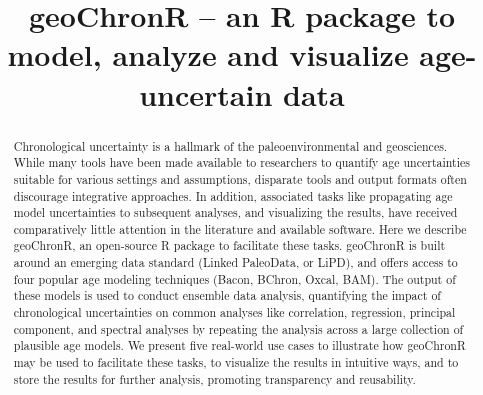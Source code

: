 \documentclass[gchron, manuscript]{copernicus}
\begin{document}
\title{geoChronR -- an R package to model, analyze and visualize age-uncertain data}














\received{}
\pubdiscuss{} %
\revised{}
\accepted{}
\published{}




\maketitle


\begin{abstract}
Chronological uncertainty is a hallmark of the paleoenvironmental and geosciences. While many tools have been made available to researchers to quantify age uncertainties suitable for various settings and assumptions, disparate tools and output formats often discourage integrative approaches. In addition, associated tasks like propagating age model uncertainties to subsequent analyses, and visualizing the results, have received comparatively little attention in the literature and available software. Here we describe geoChronR, an open-source R package to facilitate these tasks. geoChronR is built around an emerging data standard (Linked PaleoData, or LiPD), and offers access to four popular age modeling techniques (Bacon, BChron, Oxcal, BAM). The output of these models is used to conduct ensemble data analysis, quantifying the impact of chronological uncertainties on common analyses like correlation, regression, principal component, and spectral analyses by repeating the analysis across a large collection of plausible age models. We present five real-world use cases to illustrate how geoChronR may be used to facilitate these tasks, to visualize the results in intuitive ways, and to store the results for further analysis, promoting transparency and reusability.
\end{abstract}
\end{document}
